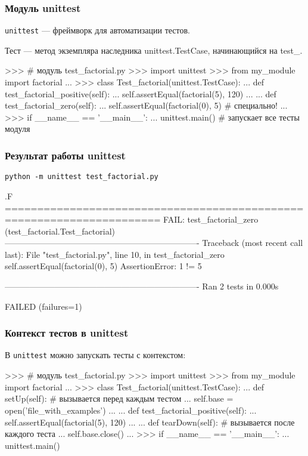 \documentclass[fleqn, xcolor=x11names]{beamer}
\begin{document}
\begin{frame}[fragile]\frametitle{Модуль unittest}
\texttt{unittest} --- фреймворк для автоматизации тестов.

Тест --- метод экземпляра наследника unittest.TestCase, начинающийся на test\_.
\begin{pcode}
>>> # модуль test_factorial.py
>>> import unittest
>>> from my_module import factorial
...
>>> class Test_factorial(unittest.TestCase):
...    def test_factorial_positive(self):
...        self.assertEqual(factorial(5), 120)
...        
...    def test_factorial_zero(self):
...        self.assertEqual(factorial(0), 5) # специально!
...
>>> if __name__ == '__main__':
...    unittest.main() # запускает все тесты модуля
\end{pcode}
\end{frame}

\begin{frame}[fragile]\frametitle{Результат работы unittest}

\texttt{python -m unittest test\_factorial.py}

\hfill

\begin{pcode}
.F
======================================================================
FAIL: test_factorial_zero (test_factorial.Test_factorial)
----------------------------------------------------------------------
Traceback (most recent call last):
  File "test_factorial.py", line 10, in test_factorial_zero
    self.assertEqual(factorial(0), 5)
AssertionError: 1 != 5

----------------------------------------------------------------------
Ran 2 tests in 0.000s

FAILED (failures=1)
\end{pcode}
\end{frame}

\begin{frame}[fragile]\frametitle{Контекст тестов в unittest}
В \texttt{unittest} можно запускать тесты с контекстом:

\begin{pcode}
>>> # модуль test_factorial.py
>>> import unittest
>>> from my_module import factorial
...
>>> class Test_factorial(unittest.TestCase):
...    def setUp(self): # вызывается перед каждым тестом
...        self.base = open('file_with_examples')
...
...    def test_factorial_positive(self):
...        self.assertEqual(factorial(5), 120)
...
...    def tearDown(self): # вызывается после каждого теста
...        self.base.close()      
...
>>> if __name__ == '__main__':
...    unittest.main() 
\end{pcode}
\end{frame}
\end{document}
